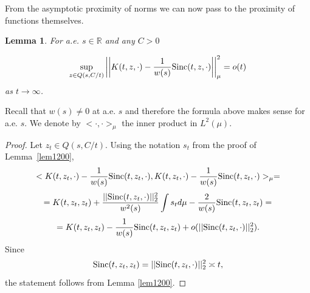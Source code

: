 \documentclass[11pt,twoside,reqno]{amsart}
\def\to{\rightarrow}
\def\R{{\mathbb R}}
\def\S{\text{\rm Sinc}}
\theoremstyle{plain}
\newtheorem{lemma}{Lemma}
\newtheorem{corollary}{Corollary}
\numberwithin{equation}{section}
\begin{document}


%	
%	
%
%
%
%

From the asymptotic proximity of norms we can now pass to the proximity of functions themselves.

\begin{lemma}\label{lemL2}
For a.e. $s\in \R$ and any  $C>0$

\begin{equation} \sup_{z\in Q(s,C/t)}\left|\left|K(t,z, \cdot)-\frac{1}{w(s)}\S(t,z, \cdot)\right|\right|^2_{\mu}=o(t)\label{eq1002}
\end{equation}
as $t\to\infty$.

\end{lemma}

Recall that $w(s)\neq 0 $ at a.e. $s$ and therefore the formula above makes sense for a.e. $s$.
We denote by $<\cdot, \cdot>_\mu$ the inner product in
$L^2(\mu)$.

\begin{proof} Let $z_t\in Q(s,C/t)$.
Using the   notation $s_t$ from the  proof of Lemma~\ref{lem1200},
$$<K(t,z_t, \cdot)-\frac{1}{w(s)}\S(t,z_t, \cdot),K(t,z_t, \cdot)-\frac{1}{w(s)}\S(t,z_t, \cdot)>_\mu= $$$$
=K(t,z_t,z_t)+\frac{||\S(t,z_t, \cdot)||^2_2}{w^2(s)}\int s_t d\mu - \frac{2}{w(s)}\S(t,z_t, z_t)=$$$$
= K(t,z_t,z_t)-\frac{1}{w(s)}\S(t,z_t, z_t)+o(||\S(t,z_t, \cdot)||^2_2).
$$
Since
$$\S(t,z_t, z_t)=||\S(t,z_t, \cdot)||^2_2\asymp t,
$$
the statement follows from Lemma \ref{lem1200}.
\end{proof}
\end{document}

